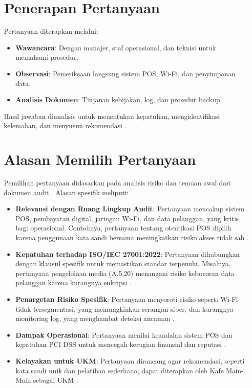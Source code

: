 \documentclass[12pt, a4paper]{report}
\begin{document}
\section{Penerapan Pertanyaan}
Pertanyaan diterapkan melalui:
\begin{itemize}
    \item \textbf{Wawancara}: Dengan manajer, staf operasional, dan teknisi untuk memahami prosedur.
    \item \textbf{Observasi}: Pemeriksaan langsung sistem POS, Wi-Fi, dan penyimpanan data.
    \item \textbf{Analisis Dokumen}: Tinjauan kebijakan, log, dan prosedur backup.
\end{itemize}
Hasil jawaban dianalisis untuk menentukan kepatuhan, mengidentifikasi kelemahan, dan menyusun rekomendasi \citep{frangky2024implementasi}.

\section{Alasan Memilih Pertanyaan}
Pemilihan pertanyaan didasarkan pada analisis risiko dan temuan awal dari dokumen audit \citep{auditkafe2025, laporanaudit}. Alasan spesifik meliputi:
\begin{itemize}
    \item \textbf{Relevansi dengan Ruang Lingkup Audit}: Pertanyaan mencakup sistem POS, pembayaran digital, jaringan Wi-Fi, dan data pelanggan, yang kritis bagi operasional. Contohnya, pertanyaan tentang otentikasi POS dipilih karena penggunaan kata sandi bersama meningkatkan risiko akses tidak sah \citep{widodo2022keamanan}.
    \item \textbf{Kepatuhan terhadap ISO/IEC 27001:2022}: Pertanyaan dihubungkan dengan klausul spesifik untuk memastikan standar terpenuhi. Misalnya, pertanyaan pengelolaan media (A.5.20) menangani risiko kebocoran data pelanggan karena kurangnya enkripsi \citep{ratnasari2021pelindungan}.
    \item \textbf{Penargetan Risiko Spesifik}: Pertanyaan menyoroti risiko seperti Wi-Fi tidak tersegmentasi, yang memungkinkan serangan siber, dan kurangnya monitoring log, yang menghambat deteksi ancaman \citep{haryanto2021wifi, sari2023backup}.
    \item \textbf{Dampak Operasional}: Pertanyaan menilai keandalan sistem POS dan kepatuhan PCI DSS untuk mencegah kerugian finansial dan reputasi \citep{permatasari2023manajemen}.
    \item \textbf{Kelayakan untuk UKM}: Pertanyaan dirancang agar rekomendasi, seperti kata sandi unik dan pelatihan sederhana, dapat diterapkan oleh Kafe Main-Main sebagai UKM \citep{rokhman2018implementasi}.
\end{itemize}
\end{document}
